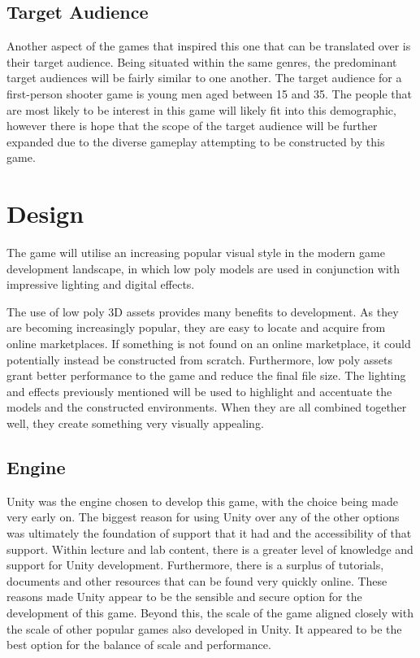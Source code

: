 \documentclass[11pt]{article}
\begin{document}
\subsection{Target Audience}
Another aspect of the games that inspired this one that can be translated over is their target
audience. Being situated within the same genres, the predominant target audiences will be fairly
similar to one another. The target audience for a first-person shooter game is young men aged
between 15 and 35. The people that are most likely to be interest in this game will likely fit
into this demographic, however there is hope that the scope of the target audience will be further
expanded due to the diverse gameplay attempting to be constructed by this game. \\


\section{Design}
The game will utilise an increasing popular visual style in the modern game development landscape,
in which low poly models are used in conjunction with impressive lighting and digital effects. 

The use of low poly 3D assets provides many benefits to development. As they are becoming
increasingly popular, they are easy to locate and acquire from online marketplaces. If something is
not found on an online marketplace, it could potentially instead be constructed from scratch.
Furthermore, low poly assets grant better performance to the game and reduce the final file size.
The lighting and effects previously mentioned will be used to highlight and accentuate the models
and the constructed environments. When they are all combined together well, they create something
very visually appealing. \\

\subsection{Engine}
Unity was the engine chosen to develop this game, with the choice being made very early on. The
biggest reason for using Unity over any of the other options was ultimately the foundation of
support that it had and the accessibility of that support. Within lecture and lab content, there is
a greater level of knowledge and support for Unity development. Furthermore, there is a surplus of
tutorials, documents and other resources that can be found very quickly online. These reasons made
Unity appear to be the sensible and secure option for the development of this game. Beyond this,
the scale of the game aligned closely with the scale of other popular games also developed in
Unity. It appeared to be the best option for the balance of scale and performance. 
\end{document}
